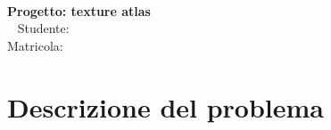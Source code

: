 
\begin{center}
	\hspace{0pt}
	\vfill
	\Huge{
		\textbf{\thetitle} \\
		\LARGE{\textbf{Progetto: texture atlas}} \\
		\ \newline \newline \newline
		\Large{	Studente: \textbf{\theauthor} } \\
		\normalsize{{Matricola: \textbf{\matNum}} }
	}
	\vfill
	\hspace{0pt}
\end{center}
\newpage

\tableofcontents    
\newpage


\iffalse


	\section{Abstract} 
	\ \newline

Il problema trattato è quello delle texture atlas, ovvero immagini di dimensioni notevoli utilizzate come raccoglitori di altre immagini, utili per accelerare l'accesso (spesso da parte della GPU) alle texture utilizzate. \\
Si vuole trovare la minima dimensione D di un'immagine quadrata tale che in un immagine D x D sia possibile inserire tutte le texture date.
	delle texture atlas



\newpage

\fi





	\section{Descrizione del problema}


